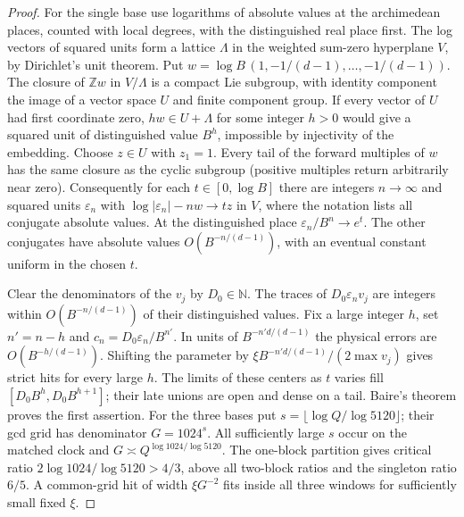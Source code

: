 \documentclass[11pt,reqno,a4paper]{amsart}
\theoremstyle{remark}
\numberwithin{equation}{section}
\begin{document}
\begin{proof}
For the single base use logarithms of absolute values at the archimedean places, counted with local degrees, with the distinguished real place first. The log vectors of squared units form a lattice \(\Lambda\) in the weighted sum-zero hyperplane \(V\), by Dirichlet's unit theorem. Put \(w=\log B\,(1,-1/(d-1),\ldots,-1/(d-1))\).
The closure of \(\mathbb Zw\) in \(V/\Lambda\) is a compact Lie subgroup, with identity component the image of a vector space \(U\) and finite component group. If every vector of \(U\) had first coordinate zero, \(hw\in U+\Lambda\) for some integer \(h>0\) would give a squared unit of distinguished value \(B^h\), impossible by injectivity of the embedding. Choose \(z\in U\) with \(z_1=1\). Every tail of the forward multiples of \(w\) has the same closure as the cyclic subgroup (positive multiples return arbitrarily near zero). Consequently for each \(t\in[0,\log B]\) there are integers \(n\to\infty\) and squared units \(\varepsilon_n\) with \(\log|\varepsilon_n|-nw\to tz\) in \(V\), where the notation lists all conjugate absolute values. At the distinguished place \(\varepsilon_n/B^n\to e^t\). The other conjugates have absolute values \(O(B^{-n/(d-1)})\), with an eventual constant uniform in the chosen \(t\).

Clear the denominators of the \(v_j\) by \(D_0\in\mathbb N\).
The traces of \(D_0\varepsilon_nv_j\) are integers within \(O(B^{-n/(d-1)})\) of their distinguished values. Fix a large integer \(h\), set \(n'=n-h\) and \(c_n=D_0\varepsilon_n/B^{n'}\).
In units of \(B^{-n'd/(d-1)}\) the physical errors are \(O(B^{-h/(d-1)})\). Shifting the parameter by \(\xi B^{-n'd/(d-1)}/(2\max v_j)\) gives strict hits for every large \(h\). The limits of these centers as \(t\) varies fill \([D_0B^h,D_0B^{h+1}]\); their late unions are open and dense on a tail. Baire's theorem proves the first assertion. For the three bases put \(s=\lfloor\log Q/\log5120\rfloor\); their gcd grid has denominator \(G=1024^s\). All sufficiently large \(s\) occur on the matched clock and \(G\asymp Q^{\log1024/\log5120}\). The one-block partition gives critical ratio \(2\log1024/\log5120>4/3\), above all two-block ratios and the singleton ratio \(6/5\). A common-grid hit of width \(\xi G^{-2}\) fits inside all three windows for sufficiently small fixed \(\xi\).


\end{proof}
\end{document}
